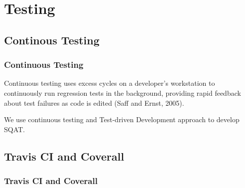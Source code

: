 \section{Testing}

\subsection{Continous Testing}
\begin{frame}
\frametitle{Continuous Testing}

\begin{definition}
Continuous testing uses excess cycles on a developer’s workstation to continuously run regression tests in the background, providing rapid feedback about test failures as code is edited (Saff and Ernst, 2005).
\end{definition}

We use continuous testing and Test-driven Development approach to develop SQAT.

\end{frame}

\subsection{Travis CI and Coverall}
\begin{frame}
\frametitle{Travis CI and Coverall}

\end{frame}